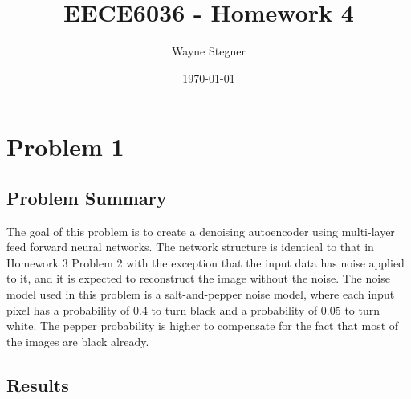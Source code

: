 \documentclass[a4paper, 12pt, titlepage]{article}
\title{EECE6036 - Homework 4}
\author{Wayne Stegner}
\date{\today}
\begin{document}
  \maketitle
  \section{Problem 1}
  \subsection{Problem Summary}
  \par The goal of this problem is to create a denoising autoencoder using
  multi-layer feed forward neural networks.
  The network structure is identical to that in Homework 3 Problem 2 with the
  exception that the input data has noise applied to it, and it is expected to
  reconstruct the image without the noise.
  The noise model used in this problem is a salt-and-pepper noise model, where
  each input pixel has a probability of 0.4 to turn black and a probability of
  0.05 to turn white.
  The pepper probability is higher to compensate for the fact that most of the
  images are black already.

  \subsection{Results}
\end{document}
